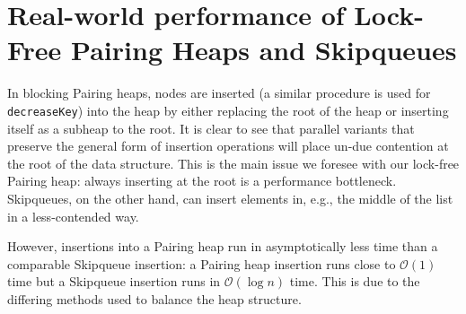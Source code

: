 \documentclass{acm_proc_article-sp}
\begin{document}

\section{Real-world performance of Lock-Free Pairing Heaps and Skipqueues}
In blocking Pairing heaps, nodes are inserted (a similar procedure is used for \texttt{decreaseKey})
into the heap by either replacing the root of the heap or inserting itself as a subheap to the root. It is clear to see that
parallel variants that preserve the general form of insertion operations will place un-due contention at the
root of the data structure. This is the main issue we foresee with our lock-free Pairing heap: always inserting at the root
is a performance bottleneck. Skipqueues, on the other hand, can insert elements in, e.g., the middle of the list in a less-contended way.

However, insertions into a Pairing heap run in asymptotically less time than a comparable Skipqueue insertion: a Pairing heap
insertion runs close to $\mathcal{O}(1)$ time but a Skipqueue insertion runs in $\mathcal{O}(\log n)$ time. This is due
to the differing methods used to balance the heap structure.



\end{document}

